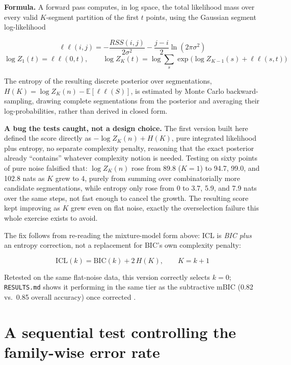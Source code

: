 \documentclass[11pt]{article}
\newcommand{\code}[1]{\texttt{#1}}
\begin{document}
\textbf{Formula.} A forward pass computes, in log space, the total
likelihood mass over every valid $K$-segment partition of the first $t$
points, using the Gaussian segment log-likelihood

\begin{equation}
\ell\ell(i, j) = -\frac{RSS(i, j)}{2\sigma^2} - \frac{j - i}{2} \ln(2\pi\sigma^2)
\end{equation}
\begin{equation}
\log Z_1(t) = \ell\ell(0, t), \qquad \log Z_K(t) = \log \sum_{s} \exp\!\Big( \log Z_{K-1}(s) + \ell\ell(s, t) \Big)
\end{equation}

The entropy of the resulting discrete posterior over segmentations, $H(K) =
\log Z_K(n) - \mathbb{E}[\ell\ell(S)]$, is estimated by Monte Carlo
backward-sampling, drawing complete segmentations from the posterior and
averaging their log-probabilities, rather than derived in closed form.

\textbf{A bug the tests caught, not a design choice.} The first version
built here defined the score directly as $-\log Z_K(n) + H(K)$, pure
integrated likelihood plus entropy, no separate complexity penalty,
reasoning that the exact posterior already ``contains'' whatever complexity
notion is needed. Testing on sixty points of pure noise falsified that:
$\log Z_K(n)$ rose from 89.8 ($K=1$) to 94.7, 99.0, and 102.8 nats as $K$
grew to 4, purely from summing over combinatorially more candidate
segmentations, while entropy only rose from 0 to 3.7, 5.9, and 7.9 nats
over the same steps, not fast enough to cancel the growth. The resulting
score kept improving as $K$ grew even on flat noise, exactly the
overselection failure this whole exercise exists to avoid.

The fix follows from re-reading the mixture-model form above: ICL is
\emph{BIC plus} an entropy correction, not a replacement for BIC's own
complexity penalty:

\begin{equation}
\mathrm{ICL}(k) = \mathrm{BIC}(k) + 2\,H(K), \qquad K = k+1
\end{equation}

Retested on the same flat-noise data, this version correctly selects $k =
0$; \code{RESULTS.md} shows it performing in the same tier as the
subtractive mBIC (0.82 vs.\ 0.85 overall accuracy) once corrected
\citep{biernacki2000}.

\section{A sequential test controlling the family-wise error rate}
\end{document}
